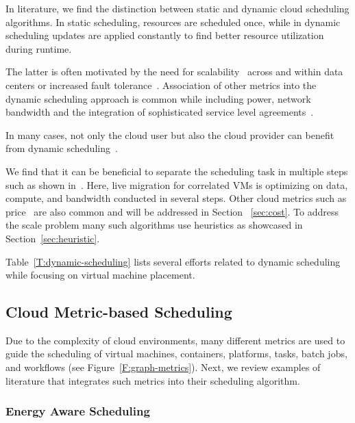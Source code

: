 \documentclass[final,5p,times,twocolumn]{elsarticle}
\begin{document}
In literature, we find the distinction between static and dynamic cloud scheduling algorithms. In static scheduling, resources are scheduled once, while in dynamic scheduling updates are applied constantly to find better resource utilization during runtime.


The latter is often motivated by the need for scalability~\cite{keller2014hierarchical} across and within data centers or increased fault tolerance~\cite{tighe2013distributed}. Association of other metrics into the dynamic scheduling approach is common while including power, network bandwidth and the integration of sophisticated service level agreements~\cite{tighe2013distributed}.

In many cases, not only the cloud user but also the cloud provider can benefit from dynamic scheduling~\cite{tighe2014integrating}.

We find that it can be beneficial to separate the scheduling task in multiple steps such as shown in~\cite{sun2015live}. Here, live migration for correlated VMs is optimizing on data, compute, and bandwidth conducted in several steps. Other cloud metrics such as price~\cite{tordsson2012cloud} are also common and will be addressed in Section ~\ref{sec:cost}. To address the scale problem many such algorithms use heuristics as showcased in Section~\ref{sec:heuristic}.

Table~\ref{T:dynamic-scheduling} lists several efforts related to dynamic scheduling while focusing on virtual machine placement.


%



\subsection{Cloud Metric-based Scheduling}\label{sec:vm-scheduling}

Due to the complexity of cloud environments, many different metrics are used to guide the scheduling of virtual machines, containers, platforms, tasks, batch jobs, and workflows (see Figure~\ref{F:graph-metrics}). Next, we review examples of literature that integrates such metrics into their scheduling algorithm.


% 


\subsubsection{Energy Aware Scheduling}\label{sec:energy}
\end{document}

